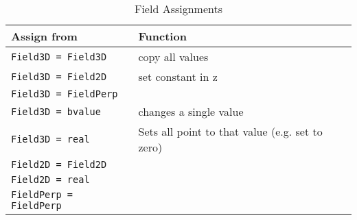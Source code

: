 \documentclass[12pt, a4paper]{article}
\newcommand{\code}[1]{\texttt{#1}}
\begin{document}
\begin{table}[h]
\centering
\caption{Field Assignments} \label{tab:field_assign}
\begin{tabular}[]{ll}
\hline
\hline
Assign from & Function \\
\hline
\code{Field3D = Field3D} & copy all values \\
\code{Field3D = Field2D} & set constant in z \\
\code{Field3D = FieldPerp} & \\
\code{Field3D = bvalue}  & changes a single value \\
\code{Field3D = real} & Sets all point to that value (e.g. set to zero) \\
\hline
\code{Field2D = Field2D} & \\
\code{Field2D = real} & \\
\hline
\code{FieldPerp = FieldPerp} & \\
\hline
\hline
\end{tabular}
\end{table}
\end{document}
